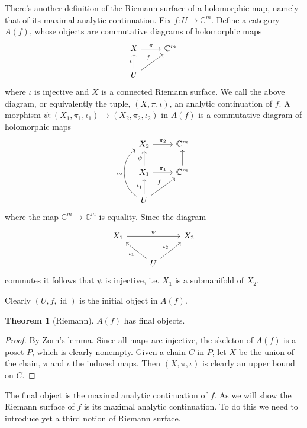 \documentclass[12pt]{report}
\newcommand{\CC}{\mathbb{C}}
\DeclareMathOperator{\id}{id}
\theoremstyle{definition}
\newtheorem{theorem}{Theorem}[chapter]
\begin{document}
There's another definition of the Riemann surface of a holomorphic map, namely that of its maximal analytic continuation.
Fix $f: U \to \CC^m$.
Define a category $A(f)$, whose objects are commutative diagrams of holomorphic maps
$$\begin{tikzcd}
X \arrow[r,"\pi"] & \CC^m\\
U \arrow[u,"\iota"] \arrow[ur,"f"]
\end{tikzcd}$$
where $\iota$ is injective and $X$ is a connected Riemann surface.
We call the above diagram, or equivalently the tuple, $(X, \pi, \iota)$, an analytic continuation of $f$.
A morphism $\psi: (X_1, \pi_1, \iota_1) \to (X_2, \pi_2, \iota_2)$ in $A(f)$ is a commutative diagram of holomorphic maps
$$\begin{tikzcd}
X_2 \arrow[r,"\pi_2"] & \CC^m\\
X_1 \arrow[u,"\psi"] \arrow[r,"\pi_1"] & \CC^m \arrow[u]\\
U \arrow[u,"\iota_1"] \arrow[bend left=60,uu,"\iota_2"] \arrow[ur,"f"]
\end{tikzcd}$$
where the map $\CC^m \to \CC^m$ is equality.
Since the diagram
$$\begin{tikzcd}
X_1 \arrow[rr,"\psi"] && X_2\\
&U \arrow[ul,"\iota_1"] \arrow[ur,"\iota_2"]
\end{tikzcd}
$$
commutes it follows that $\psi$ is injective, i.e. $X_1$ is a submanifold of $X_2$.

Clearly $(U, f, \id)$ is the initial object in $A(f)$.
\begin{theorem}[Riemann]
$A(f)$ has final objects.
\end{theorem}
\begin{proof}
By Zorn's lemma. Since all maps are injective, the skeleton of $A(f)$ is a poset $P$, which is clearly nonempty.
Given a chain $C$ in $P$, let $X$ be the union of the chain, $\pi$ and $\iota$ the induced maps. Then $(X, \pi, \iota)$ is clearly an upper bound on $C$.
\end{proof}
The final object is the maximal analytic continuation of $f$. As we will show the Riemann surface of $f$ is its maximal analytic continuation.
To do this we need to introduce yet a third notion of Riemann surface.
\end{document}
